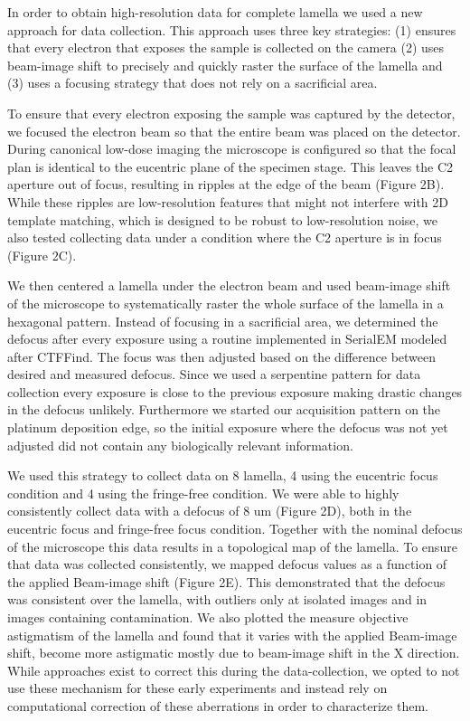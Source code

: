 \documentclass[
]{article}
\begin{document}
In order to obtain high-resolution data for complete lamella we used a new
approach for data collection. This approach uses three key strategies: (1)
ensures that every electron that exposes the sample is collected on the camera
(2) uses beam-image shift to precisely and quickly raster the surface of the
lamella and (3) uses a focusing strategy that does not rely on a sacrificial
area.

To ensure that every electron exposing the sample was captured by the detector,
we focused the electron beam so that the entire beam was placed on the detector.
During canonical low-dose imaging the microscope is configured so that the focal
plan is identical to the eucentric plane of the specimen stage. This leaves the
C2 aperture out of focus, resulting in ripples at the edge of the beam (Figure
2B). While these ripples are low-resolution features that might not interfere
with 2D template matching, which is designed to be robust to low-resolution
noise, we also tested collecting data under a condition where the C2 aperture is
in focus (Figure 2C).

We then centered a lamella under the electron beam and used beam-image shift of
the microscope to systematically raster the whole surface of the lamella in a
hexagonal pattern. Instead of focusing in a sacrificial area, we determined the
defocus after every exposure using a routine implemented in SerialEM modeled
after CTFFind. The focus was then adjusted based on the difference between
desired and measured defocus. Since we used a serpentine pattern for data
collection every exposure is close to the previous exposure making drastic
changes in the defocus unlikely. Furthermore we started our acquisition pattern
on the platinum deposition edge, so the initial exposure where the defocus was
not yet adjusted did not contain any biologically relevant information.

We used this strategy to collect data on 8 lamella, 4 using the eucentric focus
condition and 4 using the fringe-free condition. We were able to highly
consistently collect data with a defocus of 8 um (Figure 2D), both in the
eucentric focus and fringe-free focus condition. Together with the nominal
defocus of the microscope this data results in a topological map of the lamella.
To ensure that data was collected consistently, we mapped defocus values as a
function of the applied Beam-image shift (Figure 2E). This demonstrated that the
defocus was consistent over the lamella, with outliers only at isolated images
and in images containing contamination. We also plotted the measure objective
astigmatism of the lamella and found that it varies with the applied Beam-image
shift, become more astigmatic mostly due to beam-image shift in the X
direction. While approaches exist to correct this during the data-collection, we
opted to not use these mechanism for these early experiments and instead rely on
computational correction of these aberrations in order to characterize them.
\end{document}
